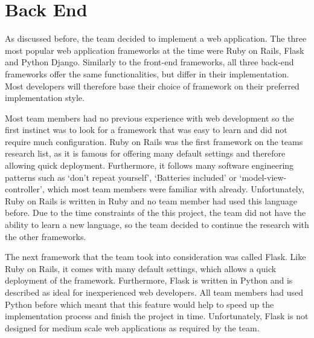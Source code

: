 \documentclass{l3proj}
\begin{document}
\section{Back End}
\par
As discussed before, the team decided to implement a web application. The three most popular web application frameworks at the time were Ruby on Rails, Flask and Python Django. Similarly to the front-end frameworks, all three back-end frameworks offer the same functionalities, but differ in their implementation. Most developers will therefore base their choice of framework on their preferred implementation style.\\
\par 
Most team members had no previous experience with web development so the first instinct was to look for a framework that was easy to learn and did not require much configuration. Ruby on Rails was the first framework on the teams research list, as it is famous for offering many default settings and therefore allowing quick deployment. Furthermore, it follows many software engineering patterns such as `don't repeat yourself', `Batteries included' or `model-view-controller', which most team members were familiar with already. Unfortunately, Ruby on Rails is written in Ruby and no team member had used this language before. Due to the time constraints of the this project, the team did not have the ability to learn a new language, so the team decided to continue the research with the other frameworks.\\
\par 
The next framework that the team took into consideration was called Flask. Like Ruby on Rails, it comes with many default settings, which allows a quick deployment of the framework. Furthermore, Flask is written in Python and is described as ideal for inexperienced web developers. All team members had used Python before which meant that this feature would help to speed up the implementation process and finish the project in time. Unfortunately, Flask is not designed for medium scale web applications as required by the team.\\
\par 
\end{document}
